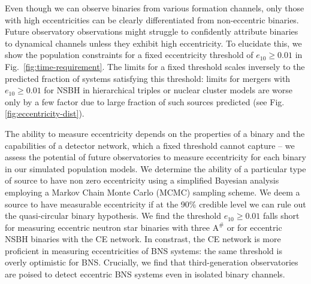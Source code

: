 Even though we can observe binaries from various formation channels, only those with high eccentricities can be clearly differentiated from non-eccentric binaries. Future observatory observations might struggle to confidently attribute binaries to dynamical channels unless they exhibit high eccentricity. To elucidate this, we show the population constraints for a fixed eccentricity threshold of $e_{10} \geq 0.01$ in Fig.~\ref{fig:time-requirement}. The limits for a fixed threshold scales inversely to the predicted fraction of systems satisfying this threshold: limits for mergers with $e_{10} \geq 0.01$ for NSBH in hierarchical triples or nuclear cluster models are worse only by a few factor due to large fraction of such sources predicted (see Fig. \ref{fig:eccentricity-dist}). 

The ability to measure eccentricity depends on the properties of a binary and the  \cite{Lower:2018seu} capabilities of a detector network, which a fixed threshold cannot capture -- we assess the potential of future observatories to measure eccentricity for each binary in our simulated population models. We determine the ability of a particular type of source to have non zero eccentricity using a simplified Bayesian analysis employing a Markov Chain Monte Carlo (MCMC) sampling scheme. We deem a source to have measurable eccentricity if at the 90\% credible level we can rule out the quasi-circular binary hypothesis. We find the threshold $e_{10} \geq 0.01$ falls short for measuring eccentric neutron star binaries with three $\text{A}^{\#}$ or for eccentric NSBH binaries with the CE network. In constrast, the CE network is more proficient in measuring eccentricities of BNS systems: the same threshold is overly optimistic for BNS.  Crucially, we find that third-generation observatories are poised to detect eccentric BNS systems even in isolated binary channels.

